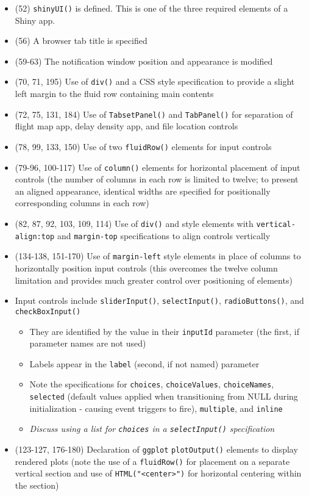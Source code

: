 \documentclass[10pt, letterpaper]{article}
\begin{document}
\begin{spacing}{1.0}
\begin{itemize}
    \item (52) \texttt{shinyUI()} is defined.  This is one of the three required elements of a Shiny app. 
    \item (56) A browser tab title is specified
    \item (59-63) The notification window position and appearance is modified 
    \item (70, 71, 195) Use of \texttt{div()} and a CSS style specification to provide a slight left margin to the fluid row containing main contents
    \item (72, 75, 131, 184) Use of \texttt{TabsetPanel()} and \texttt{TabPanel()} for separation of flight map app, delay density app, and file location controls
    \item (78, 99, 133, 150) Use of two \texttt{fluidRow()} elements for input controls
    \item (79-96, 100-117) Use of \texttt{column()} elements for horizontal placement of input controls (the number of columns in each row is limited to twelve; to present an aligned appearance, identical widths are specified for positionally corresponding columns in each row)
    \item (82, 87, 92, 103, 109, 114) Use of \texttt{div()} and style elements with \texttt{vertical-align:top} and \texttt{margin-top} specifications to align controls vertically
    \item (134-138, 151-170) Use of \texttt{margin-left} style elements in place of columns to horizontally position input controls (this overcomes the twelve column limitation and provides much greater control over positioning of elements)
    \item Input controls include \texttt{sliderInput()}, \texttt{selectInput()}, \texttt{radioButtons()}, and \texttt{checkBoxInput()}
    \begin{itemize}
            \item They are identified by the value in their \texttt{inputId} parameter (the first, if parameter names are not used)
            \item Labels appear in the \texttt{label} (second, if not named) parameter
            \item Note the specifications for \texttt{choices}, \texttt{choiceValues}, \texttt{choiceNames}, \texttt{selected} (default values applied when transitioning from NULL during initialization - causing event triggers to fire), \texttt{multiple}, and \texttt{inline}
            \item \textit{Discuss using a list for \texttt{choices} in a \texttt{selectInput()} specification}
    \end{itemize}
    \item (123-127, 176-180) Declaration of \texttt{ggplot} \texttt{plotOutput()} elements to display rendered plots (note the use of a \texttt{fluidRow()} for placement on a separate vertical section and use of \texttt{HTML("<center>")} for horizontal centering within the section)
\end{itemize}


\end{spacing}
\end{document}
